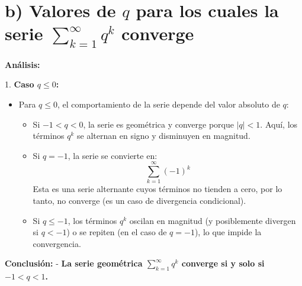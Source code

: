 \section*{b) Valores de \( q \) para los cuales la serie \(\sum_{k=1}^{\infty} q^k\) converge}
 
 \textbf{Análisis:}
 
 1. \textbf{Caso \( q \leq 0 \):}
    \begin{itemize}
    \item Para \( q \leq 0 \), el comportamiento de la serie depende del valor absoluto de \( q \):
      \begin{itemize}
      \item Si \( -1 < q < 0 \), la serie es geométrica y converge porque \( |q| < 1 \). Aquí, los términos \( q^k \) se alternan en signo y disminuyen en magnitud.
      \item Si \( q = -1 \), la serie se convierte en:
        \[
        \sum_{k=1}^{\infty} (-1)^k
        \]
        Esta es una serie alternante cuyos términos no tienden a cero, por lo tanto, no converge (es un caso de divergencia condicional).
      \item Si \( q \leq -1 \), los términos \( q^k \) oscilan en magnitud (y posiblemente divergen si \( q < -1 \)) o se repiten (en el caso de \( q = -1 \)), lo que impide la convergencia.
      \end{itemize}
    \end{itemize}
 
 \textbf{Conclusión:}
 - \textbf{La serie geométrica \(\sum_{k=1}^{\infty} q^k\) converge si y solo si \( -1 < q < 1 \).}